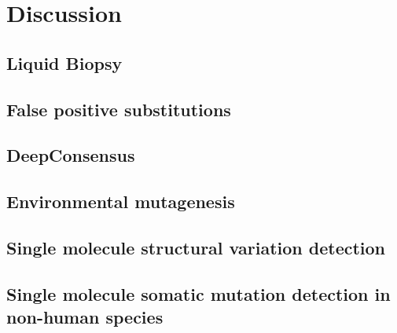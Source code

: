 \subsection{}
\subsection{}
\section{Discussion}
\subsection{Liquid Biopsy}
\subsection{False positive substitutions}
\subsection{DeepConsensus}
\subsection{Environmental mutagenesis}
\subsection{Single molecule structural variation detection}
\subsection{Single molecule somatic mutation detection in non-human species}

